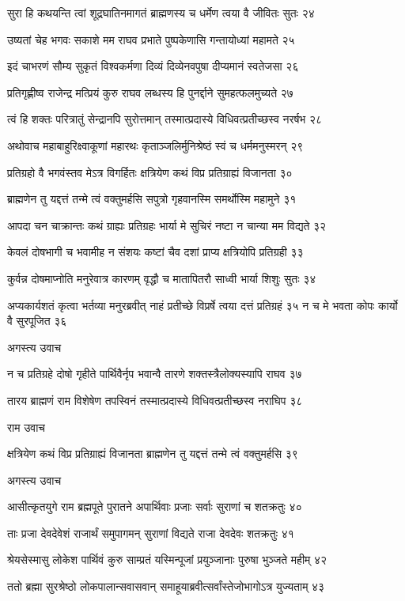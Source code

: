 सुरा हि कथयन्ति त्वां शूद्रघातिनमागतं
ब्राह्मणस्य च धर्मेण त्वया वै जीवितः सुतः २४

उष्यतां चेह भगवः सकाशे मम राघव
प्रभाते पुष्पकेणासि गन्तायोध्यां महामते २५

इदं चाभरणं सौम्य सुकृतं विश्वकर्मणा
दिव्यं दिव्येनवपुषा दीप्यमानं स्वतेजसा २६

प्रतिगृह्णीष्व राजेन्द्र मत्प्रियं कुरु राघव
लब्धस्य हि पुनर्द्दाने सुमहत्फलमुच्यते २७

त्वं हि शक्तः परित्रातुं सेन्द्रानपि सुरोत्तमान्
तस्मात्प्रदास्ये विधिवत्प्रतीच्छस्व नरर्षभ २८

अथोवाच महाबाहुरिक्ष्वाकूणां महारथः
कृताञ्जलिर्मुनिश्रेष्ठं स्वं च धर्ममनुस्मरन् २९

प्रतिग्रहो वै भगवंस्तव मेऽत्र विगर्हितः
क्षत्रियेण कथं विप्र प्रतिग्राह्यं विजानता ३०

ब्राह्मणेन तु यद्दत्तं तन्मे त्वं वक्तुमर्हसि
सपुत्रो गृहवानस्मि समर्थोस्मि महामुने ३१

आपदा चन चाक्रान्तः कथं ग्राह्यः प्रतिग्रहः
भार्या मे सुचिरं नष्टा न चान्या मम विद्यते ३२

केवलं दोषभागी च भवामीह न संशयः
कष्टां चैव दशां प्राप्य क्षत्रियोपि प्रतिग्रही ३३

कुर्वन्न दोषमाप्नोति मनुरेवात्र कारणम्
वृद्धौ च मातापितरौ साध्वी भार्या शिशुः सुतः ३४

अप्यकार्यशतं कृत्वा भर्तव्या मनुरब्रवीत्
नाहं प्रतीच्छे विप्रर्षे त्वया दत्तं प्रतिग्रहं ३५
न च मे भवता कोपः कार्यो वै सुरपूजित ३६

अगस्त्य उवाच

न च प्रतिग्रहे दोषो गृहीते पार्थिवैर्नृप
भवान्वै तारणे शक्तस्त्रैलोक्यस्यापि राघव ३७

तारय ब्राह्मणं राम विशेषेण तपस्विनं
तस्मात्प्रदास्ये विधिवत्प्रतीच्छस्व नराघिप ३८

राम उवाच

क्षत्रियेण कथं विप्र प्रतिग्राह्यं विजानता
ब्राह्मणेन तु यद्दत्तं तन्मे त्वं वक्तुमर्हसि ३९

अगस्त्य उवाच

आसीत्कृतयुगे राम ब्रह्मपूते पुरातने
अपार्थिवाः प्रजाः सर्वाः सुराणां च शतक्रतुः ४०

ताः प्रजा देवदेवेशं राजार्थं समुपागमन्
सुराणां विद्यते राजा देवदेवः शतक्रतुः ४१

श्रेयसेस्मासु लोकेश पार्थिवं कुरु साम्प्रतं
यस्मिन्पूजां प्रयुञ्जानाः पुरुषा भुञ्जते महीम् ४२

ततो ब्रह्मा सुरश्रेष्ठो लोकपालान्सवासवान्
समाहूयाब्रवीत्सर्वांस्तेजोभागोऽत्र युज्यताम् ४३

